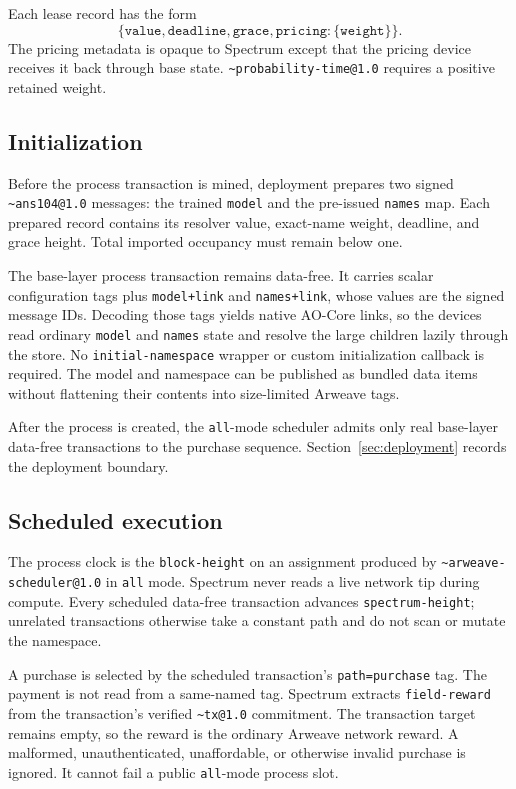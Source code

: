 \documentclass[10pt,twocolumn]{article}
\newcommand{\device}[1]{\texttt{\textasciitilde#1}}
\newcommand{\key}[1]{\texttt{#1}}
\begin{document}
Each lease record has the form
\[
\{\key{value},\key{deadline},\key{grace},
  \key{pricing}:\{\key{weight}\}\}.
\]
The pricing metadata is opaque to Spectrum except that the pricing device
receives it back through base state. \device{probability-time@1.0} requires a
positive retained weight.

\subsection{Initialization}

Before the process transaction is mined, deployment prepares two signed
\device{ans104@1.0} messages: the trained \key{model} and the pre-issued
\key{names} map. Each prepared record contains its resolver value, exact-name
weight, deadline, and grace height. Total imported occupancy must remain below
one.

The base-layer process transaction remains data-free. It carries scalar
configuration tags plus \key{model+link} and \key{names+link}, whose values are
the signed message IDs. Decoding those tags yields native AO-Core links, so the
devices read ordinary \key{model} and \key{names} state and resolve the large
children lazily through the store. No \key{initial-namespace} wrapper or custom
initialization callback is required. The model and namespace can be published
as bundled data items without flattening their contents into size-limited
Arweave tags.

After the process is created, the \key{all}-mode scheduler admits only real
base-layer data-free transactions to the purchase sequence.
Section~\ref{sec:deployment} records the deployment boundary.

\subsection{Scheduled execution}

The process clock is the \key{block-height} on an assignment produced by
\device{arweave-scheduler@1.0} in \key{all} mode. Spectrum never reads a live
network tip during compute. Every scheduled data-free transaction advances
\key{spectrum-height}; unrelated transactions otherwise take a constant path
and do not scan or mutate the namespace.

A purchase is selected by the scheduled transaction's \key{path=purchase} tag.
The payment is not read from a same-named tag. Spectrum extracts
\key{field-reward} from the transaction's verified \device{tx@1.0} commitment.
The transaction target remains empty, so the reward is the ordinary Arweave
network reward. A malformed, unauthenticated, unaffordable, or otherwise invalid
purchase is ignored. It cannot fail a public \key{all}-mode process slot.
\end{document}
